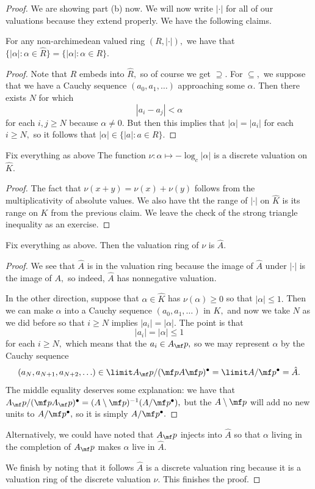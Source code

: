 \begin{proof}
	We are showing part (b) now. We will now write $|\cdot|$ for all of our valuations because they extend properly. We have the following claims.
	\begin{lemma}
		For any non-archimedean valued ring $(R,|\cdot|),$ we have that $\{|\alpha|:\alpha\in\hat R\}=\{|\alpha|:\alpha\in R\}.$
	\end{lemma}
	\begin{proof}
		Note that $R$ embeds into $\hat R,$ so of course we get $\supseteq.$ For $\subseteq,$ we suppose that we have a Cauchy sequence $(a_0,a_1,\ldots)$ approaching some $\alpha.$ Then there exists $N$ for which
		\[|a_i-a_j|<\alpha\]
		for each $i,j\ge N$ because $\alpha\ne0.$ But then this implies that $|\alpha|=|a_i|$ for each $i\ge N,$ so it follows that $|\alpha|\in\{|a|:a\in R\}.$
	\end{proof}
	\begin{lemma}
		Fix everything as above The function $\nu:\alpha\mapsto-\log_c|\alpha|$ is a discrete valuation on $\hat K.$
	\end{lemma}
	\begin{proof}
		The fact that $\nu(x+y)=\nu(x)+\nu(y)$ follows from the multiplicativity of absolute values. We also have tht the range of $|\cdot|$ on $\hat K$ is its range on $K$ from the previous claim. We leave the check of the strong triangle inequality as an exercise.
	\end{proof}
	\begin{lemma} \label{lem:something}
		Fix everything as above. Then the valuation ring of $\nu$ is $\hat A.$
	\end{lemma}
	\begin{proof}
		We see that $\hat A$ is in the valuation ring because the image of $\hat A$ under $|\cdot|$ is the image of $A,$ so indeed, $\hat A$ has nonnegative valuation.

		In the other direction, suppose that $\alpha\in\hat K$ has $\nu(\alpha)\ge0$ so that $|\alpha|\le1.$ Then we can make $\alpha$ into a Cauchy sequence $(a_0,a_1,\ldots)$ in $K,$ and now we take $N$ as we did before so that $i\ge N$ implies $|a_i|=|\alpha|.$ The point is that
		\[|a_i|=|\alpha|\le1\]
		for each $i\ge N,$ which means that the $a_i\in A_\mf p,$ so we may represent $\alpha$ by the Cauchy sequence
		\[(a_N,a_{N+1},a_{N+2},\ldots)\in\limit A_\mf p/(\mf pA\mf p)^\bullet=\limit A/\mf p^\bullet=\hat A.\]
		The middle equality deserves some explanation: we have that $A_\mf p/(\mf pA_\mf p)^\bullet=(A\setminus\mf p)^{-1}(A/\mf p^\bullet),$ but the $A\setminus\mf p$ will add no new units to $A/\mf p^\bullet,$ so it is simply $A/\mf p^\bullet.$
	\end{proof}
	\begin{remark}
		Alternatively, we could have noted that $A_\mf p$ injects into $\hat A$ so that $\alpha$ living in the completion of $A_\mf p$ makes $\alpha$ live in $\hat A.$
	\end{remark}
	We finish by noting that it follows $\hat A$ is a discrete valuation ring because it is a valuation ring of the discrete valuation $\nu.$ This finishes the proof.
\end{proof}
